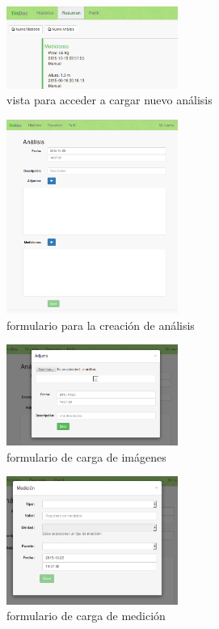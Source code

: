     
    \begin{figure}[h]
        \centering
        \includegraphics[width=0.5\textwidth]{img/5-boton_nuevo_analisis}
        \caption{vista para acceder a cargar nuevo análisis}
		\label{5-boton_nuevo_analisis}
    \end{figure}
    
    \begin{figure}[h]
        \centering
        \includegraphics[width=0.5\textwidth]{img/5-crear_analisis}
        \caption{formulario para la creación de análisis}
		\label{5-crear_analisis}
    \end{figure}
    
    \begin{figure}[h]
        \centering
        \includegraphics[width=0.5\textwidth]{img/5-cargar_img}
        \caption{formulario de carga de imágenes}
		\label{5-cargar_img}
    \end{figure}
    \begin{figure}[h]
        \centering
        \includegraphics[width=0.5\textwidth]{img/5-cargar_medicion}
        \caption{formulario de carga de medición}
		\label{5-cargar_medicion}
    \end{figure}

